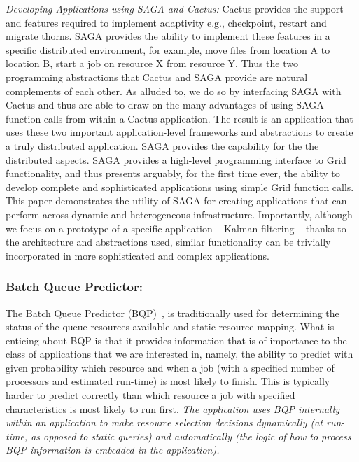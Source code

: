 \documentclass[conference,final]{IEEEtran}
\begin{document}
{\it Developing Applications using SAGA and Cactus:} Cactus provides
the support and features required to implement adaptivity e.g.,
checkpoint, restart and migrate thorns. SAGA provides the ability to
implement these features in a specific distributed environment, for
example, move files from location A to location B, start a job on
resource X from resource Y.  Thus the two programming abstractions
that Cactus and SAGA provide are natural complements of each other.
As alluded to, we do so by interfacing SAGA with Cactus and thus are
able to draw on the many advantages of using SAGA function calls from
within a Cactus application.  The result is an application that uses
these two important application-level frameworks and abstractions to
create a truly distributed application.  SAGA provides the capability
for the the distributed aspects. SAGA provides a high-level
programming interface to Grid functionality, and thus presents
arguably, for the first time ever, the ability to develop complete and
sophisticated applications using simple Grid function calls.  This
paper demonstrates the utility of SAGA for creating applications that
can perform across dynamic and heterogeneous infrastructure.
Importantly, although we focus on a prototype of a specific
application -- Kalman filtering -- thanks to the architecture and
abstractions used, similar functionality can be trivially incorporated
in more sophisticated and complex applications.

\subsubsection{Batch Queue Predictor:} 

 The Batch
Queue Predictor (BQP)~\cite{bqp, bqp_url}, is traditionally used for
determining the status of the queue resources available and static
resource mapping. What is enticing about BQP is that it provides
information that is of importance to the class of applications that we
are interested in, namely, the ability to predict with given
probability which resource and when a job (with a specified number of
processors and estimated run-time) is most likely to finish.  This is
typically harder to predict correctly than which resource a job with
specified characteristics is most likely to run first.  {\it The
  application uses BQP internally within an application to make
  resource selection decisions dynamically (at run-time, as opposed to
  static queries) and automatically (the logic of how to process BQP
  information is embedded in the application).}
\end{document}
